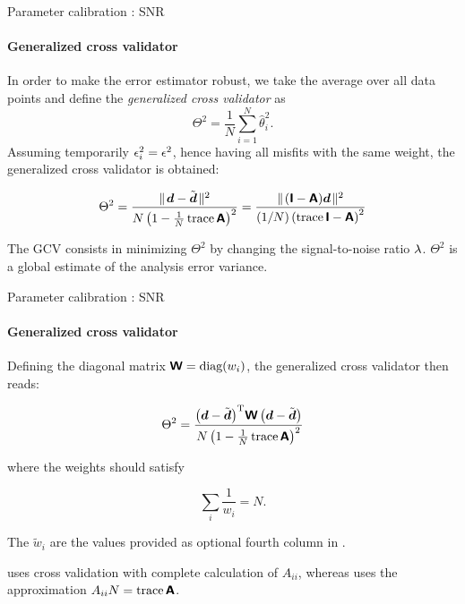 
\begin{frame}{Parameter calibration : SNR}
\framesubtitle{Generalized cross validator}

In order to make the error estimator robust, we take the average over all data points and define the \textit{generalized cross validator} as 
\[
\Theta^{2}=\frac{1}{N}\sum_{i=1}^{N}\hat{\theta}_i^2.
\] 
Assuming temporarily $\epsilon_{i}^{2} = \epsilon^{2}$, hence having all misfits with the same weight, the generalized cross validator is obtained:

\begin{equation}
\Theta^2=\frac{\parallel \! \mbox{\boldmath $ d $}-\tilde{\mbox{\boldmath $ d $}} \! \parallel^2}{N \left(1- \frac{1}{N}\operatorname{trace}{\mbox{\boldmath $ \protect\mathsf{A} $}}\right)^2} 
        =\frac{\parallel \! (\mbox{\boldmath $ \protect\mathsf{I} $}-\mbox{\boldmath $ \protect\mathsf{A} $})\mbox{\boldmath $ d $} \! \parallel^2}{(1/N)\left(\operatorname{trace}{\mbox{\boldmath $ \protect\mathsf{I} $}-\mbox{\boldmath $ \protect\mathsf{A} $}}\right)^2}
\label{eq:gcv}
\end{equation}

The GCV consists in minimizing $\Theta^{2}$ by changing the signal-to-noise ratio $\lambda$. $\Theta^2$ is a global estimate of the analysis error variance.

\end{frame}


\begin{frame}{Parameter calibration : SNR}
\framesubtitle{Generalized cross validator}

Defining the diagonal matrix $\mbox{\boldmath $ \protect\mathsf{W} $} = \mbox{diag}(w_i)$, the generalized cross validator then reads:

\begin{equation}
\Theta^2=\frac{ {\left(\mbox{\boldmath $ d $}-\tilde{\mbox{\boldmath $ d $}}\right)}^{\protect\mathrm{T}} \mbox{\boldmath $ \protect\mathsf{W} $} \left(\mbox{\boldmath $ d $}-\tilde{\mbox{\boldmath $ d $}}\right) }{ N \left(1 - \frac{1}{N}\operatorname{trace}{\mbox{\boldmath $ \protect\mathsf{A} $}}\right)^2} 
\label{eq:gcvbis}
\end{equation}

where the weights should satisfy

\begin{equation}
\sum_i \frac{1 }{w_i} = N.
\label{eq:condition}
\end{equation}

The $\tilde{w}_i$ are the values provided as optional fourth column in .

 uses cross validation with complete calculation of $A_{ii}$, whereas  uses the approximation $A_{ii} N=\operatorname{trace}{\mbox{\boldmath $ \protect\mathsf{A} $}}$.

\end{frame}


